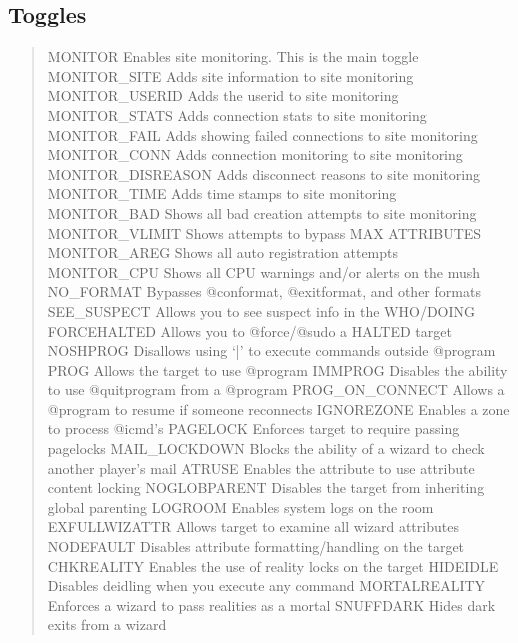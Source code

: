 \documentclass[letterpaper,10pt,english]{sphinxmanual}
\begin{document}
\subsection{Toggles}
\label{\detokenize{security:toggles}}\begin{quote}

\sphinxAtStartPar
MONITOR            \sphinxhyphen{} Enables site monitoring.  This is the main toggle
MONITOR\_SITE       \sphinxhyphen{} Adds site information to site monitoring
MONITOR\_USERID     \sphinxhyphen{} Adds the userid to site monitoring
MONITOR\_STATS      \sphinxhyphen{} Adds connection stats to site monitoring
MONITOR\_FAIL       \sphinxhyphen{} Adds showing failed connections to site monitoring
MONITOR\_CONN       \sphinxhyphen{} Adds connection monitoring to site monitoring
MONITOR\_DISREASON  \sphinxhyphen{} Adds disconnect reasons to site monitoring
MONITOR\_TIME       \sphinxhyphen{} Adds time stamps to site monitoring
MONITOR\_BAD        \sphinxhyphen{} Shows all bad creation attempts to site monitoring
MONITOR\_VLIMIT     \sphinxhyphen{} Shows attempts to bypass MAX ATTRIBUTES
MONITOR\_AREG       \sphinxhyphen{} Shows all auto registration attempts
MONITOR\_CPU        \sphinxhyphen{} Shows all CPU warnings and/or alerts on the mush
NO\_FORMAT          \sphinxhyphen{} Bypasses @conformat, @exitformat, and other formats
SEE\_SUSPECT        \sphinxhyphen{} Allows you to see suspect info in the WHO/DOING
FORCEHALTED        \sphinxhyphen{} Allows you to @force/@sudo a HALTED target
NOSHPROG           \sphinxhyphen{} Disallows using ‘|’ to execute commands outside @program
PROG               \sphinxhyphen{} Allows the target to use @program
IMMPROG            \sphinxhyphen{} Disables the ability to use @quitprogram from a @program
PROG\_ON\_CONNECT    \sphinxhyphen{} Allows a @program to resume if someone reconnects
IGNOREZONE         \sphinxhyphen{} Enables a zone to process @icmd’s
PAGELOCK           \sphinxhyphen{} Enforces target to require passing pagelocks
MAIL\_LOCKDOWN      \sphinxhyphen{} Blocks the ability of a wizard to check another player’s mail
ATRUSE             \sphinxhyphen{} Enables the attribute to use attribute content locking
NOGLOBPARENT       \sphinxhyphen{} Disables the target from inheriting global parenting
LOGROOM            \sphinxhyphen{} Enables system logs on the room
EXFULLWIZATTR      \sphinxhyphen{} Allows target to examine all wizard attributes
NODEFAULT          \sphinxhyphen{} Disables attribute formatting/handling on the target
CHKREALITY         \sphinxhyphen{} Enables the use of reality locks on the target
HIDEIDLE           \sphinxhyphen{} Disables deidling when you execute any command
MORTALREALITY      \sphinxhyphen{} Enforces a wizard to pass realities as a mortal
SNUFFDARK          \sphinxhyphen{} Hides dark exits from a wizard
\end{quote}
\end{document}
